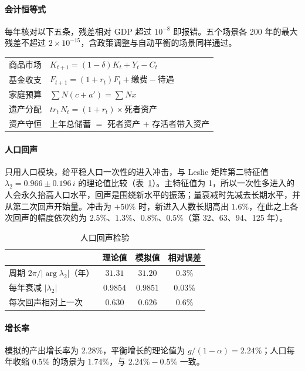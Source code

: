 \documentclass[UTF8,11pt,a4paper]{ctexart}
\begin{document}
\paragraph{会计恒等式} 每年核对以下五条，残差相对 GDP 超过 $10^{-8}$ 即报错。五个场景各 200 年的最大残差不超过 $2\times10^{-15}$，含政策调整与自动平衡的场景同样通过。
\begin{center}\small
\begin{tabular}{ll}
\toprule
商品市场 & $K_{t+1} = (1-\delta)K_t + Y_t - C_t$ \\
基金收支 & $F_{t+1} = (1+r_t)F_t + \text{缴费} - \text{待遇}$ \\
家庭预算 & $\sum N(c+a') = \sum N x$ \\
遗产分配 & $tr_t\,N_t = (1+r_t)\times\text{死者资产}$ \\
资产守恒 & 上年总储蓄 $=$ 死者资产 $+$ 存活者带入资产 \\
\bottomrule
\end{tabular}
\end{center}

\paragraph{人口回声} 只用人口模块，给平稳人口一次性的进入冲击，与 Leslie 矩阵第二特征值 $\lambda_2 = 0.966 \pm 0.196\,i$ 的理论值比较（表~\ref{tab:echo}）。主特征值为 1，所以一次性多进入的人会永久抬高人口水平，回声是围绕新水平的振荡；量衰减时先减去长期水平，并从第二次回声开始量。冲击为 $+50\%$ 时，新进入人数长期高出 $1.6\%$，在此之上各次回声的幅度依次约为 $2.5\%$、$1.3\%$、$0.8\%$、$0.5\%$（第 32、63、94、125 年）。

\begin{table}[H]
\centering\small
\caption{人口回声检验}\label{tab:echo}
\begin{tabular}{lccc}
\toprule
 & 理论值 & 模拟值 & 相对误差 \\
\midrule
周期 $2\pi/|\arg\lambda_2|$（年） & $31.31$ & $31.20$ & $0.3\%$ \\
每年衰减 $|\lambda_2|$ & $0.9854$ & $0.9851$ & $0.03\%$ \\
每次回声相对上一次 & $0.630$ & $0.626$ & $0.6\%$ \\
\bottomrule
\end{tabular}
\end{table}

\paragraph{增长率} 模拟的产出增长率为 $2.28\%$，平衡增长的理论值为 $g/(1-\alpha)=2.24\%$；人口每年收缩 $0.5\%$ 的场景为 $1.74\%$，与 $2.24\%-0.5\%$ 一致。
\end{document}
